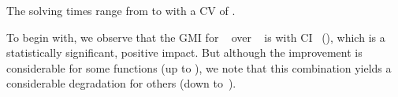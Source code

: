 %
The solving times range from
\printMinSolvingTime{
  \SolvTechEnableOnlyGoodPresolvingPrePlusSolvingTimeSpeedupNonePrePlusSolvingTimeAvgMin,
  \SolvTechEnableOnlyGoodPresolvingPrePlusSolvingTimeSpeedupPrePlusSolvingTimeAvgMin,
  \SolvTechDisableBadPresolvingPrePlusSolvingTimeSpeedupPrePlusSolvingTimeAvgMin,
  \SolvTechDisableAllPresolvingPrePlusSolvingTimeSpeedupPrePlusSolvingTimeAvgMin
} to
\printMaxSolvingTime{
  \SolvTechEnableOnlyGoodPresolvingPrePlusSolvingTimeSpeedupNonePrePlusSolvingTimeAvgMax,
  \SolvTechEnableOnlyGoodPresolvingPrePlusSolvingTimeSpeedupPrePlusSolvingTimeAvgMax,
  \SolvTechDisableBadPresolvingPrePlusSolvingTimeSpeedupPrePlusSolvingTimeAvgMax,
  \SolvTechDisableAllPresolvingPrePlusSolvingTimeSpeedupPrePlusSolvingTimeAvgMax
} with a \gls{CV} of
\numMaxOf{
  \SolvTechEnableOnlyGoodPresolvingPrePlusSolvingTimeSpeedupNonePrePlusSolvingTimeCvMax,
  \SolvTechEnableOnlyGoodPresolvingPrePlusSolvingTimeSpeedupPrePlusSolvingTimeCvMax,
  \SolvTechDisableBadPresolvingPrePlusSolvingTimeSpeedupPrePlusSolvingTimeCvMax,
  \SolvTechDisableAllPresolvingPrePlusSolvingTimeSpeedupPrePlusSolvingTimeCvMax
}.

To begin with, we observe that the \gls{GMI} for ~ over ~ is \printGMI{%
  \SolvTechEnableOnlyGoodPresolvingPrePlusSolvingTimeSpeedupPrePlusSolvingTimeRegularSpeedupGmean%
} with \gls{CI}~\printGMICI{%
  \SolvTechEnableOnlyGoodPresolvingPrePlusSolvingTimeSpeedupPrePlusSolvingTimeRegularSpeedupCiMin%
}{%
  \SolvTechEnableOnlyGoodPresolvingPrePlusSolvingTimeSpeedupPrePlusSolvingTimeRegularSpeedupCiMax%
} (), which is a statistically
significant, positive impact.
%
But although the improvement is considerable for some \glspl{function} (up to
\printZCNorm{%
  \SolvTechEnableOnlyGoodPresolvingPrePlusSolvingTimeSpeedupPrePlusSolvingTimeZeroCenteredSpeedupMax%
}), we note that this combination yields a considerable degradation for others
(down
to~\printZCNorm{%
  \SolvTechEnableOnlyGoodPresolvingPrePlusSolvingTimeSpeedupPrePlusSolvingTimeZeroCenteredSpeedupMin%
}).

